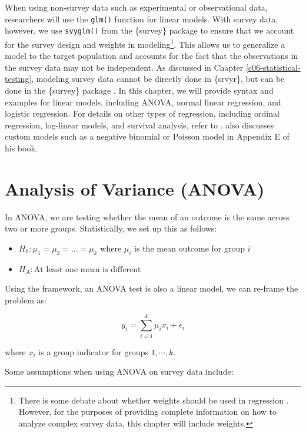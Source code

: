 \documentclass[
]{krantz}
\providecommand{\tightlist}{%
  \setlength{\itemsep}{0pt}\setlength{\parskip}{0pt}}
\begin{document}
When using non-survey data such as experimental or observational data, researchers will use the \texttt{glm()} function for linear models. With survey data, however, we use \texttt{svyglm()} from the \{survey\} package to ensure that we account for the survey design and weights in modeling\footnote{There is some debate about whether weights should be used in regression \citep{gelman2007weights, bollen2016weightsreg}. However, for the purposes of providing complete information on how to analyze complex survey data, this chapter will include weights.}. This allows us to generalize a model to the target population and accounts for the fact that the observations in the survey data may not be independent. As discussed in Chapter \ref{c06-statistical-testing}, modeling survey data cannot be directly done in \{srvyr\}, but can be done in the \{survey\} package \citep{lumley2010complex, R-survey}. In this chapter, we will provide syntax and examples for linear models, including ANOVA, normal linear regression, and logistic regression. For details on other types of regression, including ordinal regression, log-linear models, and survival analysis, refer to \citet{lumley2010complex}. \citet{lumley2010complex} also discusses custom models such as a negative binomial or Poisson model in Appendix E of his book.

\hypertarget{analysis-of-variance-anova}{%
\section{Analysis of Variance (ANOVA)}\label{analysis-of-variance-anova}}

In ANOVA, we are testing whether the mean of an outcome is the same across two or more groups. Statistically, we set up this as follows:

\begin{itemize}
\tightlist
\item
  \(H_0: \mu_1 = \mu_2= \dots = \mu_k\) where \(\mu_i\) is the mean outcome for group \(i\)
\item
  \(H_A: \text{At least one mean is different}\)
\end{itemize}

Using the framework, an ANOVA test is also a linear model, we can re-frame the problem as:

\[ y_i=\sum_{i=1}^k \mu_i x_i + \epsilon_i\]

where \(x_i\) is a group indicator for groups \(1, \cdots, k\).

Some assumptions when using ANOVA on survey data include:
\end{document}
